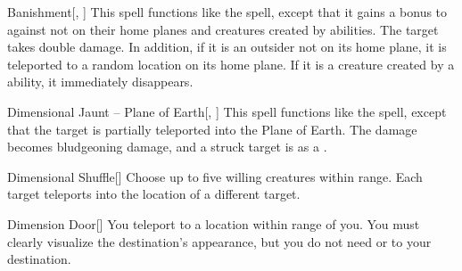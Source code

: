 \lowercase{\hypertarget{spell:Banishment}{}}\label{spell:Banishment}
\begin{apability}[\nth{2}]{\hypertarget{spell:Banishment}{Banishment}}[, ]
This spell functions like the  spell, except that it gains a  bonus to  against  not on their home planes and creatures created by  abilities.
\crit The target takes double damage.
In addition, if it is an outsider not on its home plane, it is teleported to a random location on its home plane.
If it is a creature created by a  ability, it immediately disappears.
\end{apability}
\vspace{0.25em}



\lowercase{\hypertarget{spell:Dimensional Jaunt -- Plane of Earth}{}}\label{spell:Dimensional Jaunt -- Plane of Earth}
\begin{apability}[\nth{2}]{\hypertarget{spell:Dimensional Jaunt -- Plane of Earth}{Dimensional Jaunt -- Plane of Earth}}[, ]
This spell functions like the  spell, except that the target is partially teleported into the Plane of Earth.
The damage becomes bludgeoning damage, and a struck target is  as a .
\end{apability}
\vspace{0.25em}



\lowercase{\hypertarget{spell:Dimensional Shuffle}{}}\label{spell:Dimensional Shuffle}
\begin{apability}[\nth{2}]{\hypertarget{spell:Dimensional Shuffle}{Dimensional Shuffle}}[]
Choose up to five willing creatures within \rngmed range.
Each target teleports into the location of a different target.
\end{apability}
\vspace{0.25em}



\lowercase{\hypertarget{spell:Dimension Door}{}}\label{spell:Dimension Door}
\begin{apability}[\nth{3}]{\hypertarget{spell:Dimension Door}{Dimension Door}}[]
You teleport to a location within \rngext range of you.
You must clearly visualize the destination's appearance, but you do not need  or  to your destination.
\end{apability}
\vspace{0.25em}



